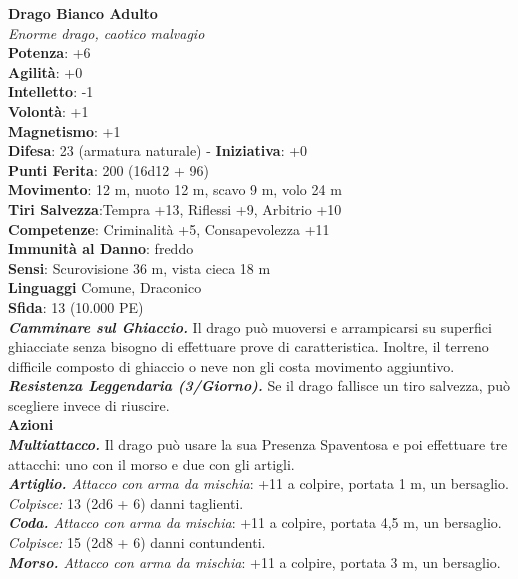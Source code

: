 \begin{multicols}{2}
\medskip\textbf{Drago Bianco Adulto}\\
\emph{Enorme drago, caotico malvagio}\\
\textbf{Potenza}: +6\\
\textbf{Agilità}: +0\\
\textbf{Intelletto}: -1\\
\textbf{Volontà}: +1\\
\textbf{Magnetismo}: +1\\
\textbf{Difesa}: 23 (armatura naturale) - \textbf{Iniziativa}: +0\\
\textbf{Punti Ferita}: 200 (16d12 + 96)\\
\textbf{Movimento}: 12 m, nuoto 12 m, scavo 9 m, volo 24 m\\
\textbf{Tiri Salvezza}:Tempra +13, Riflessi +9, Arbitrio +10\\
\textbf{Competenze}: Criminalità +5, Consapevolezza +11\\
\textbf{Immunità al Danno}: freddo\\
\textbf{Sensi}: Scurovisione 36 m, vista cieca 18 m\\
\textbf{Linguaggi} Comune, Draconico\\
\textbf{Sfida}: 13 (10.000 PE)\smallskip\\
\emph{\textbf{Camminare sul Ghiaccio.}} Il drago può muoversi e arrampicarsi su superfici ghiacciate senza bisogno di effettuare prove di caratteristica. Inoltre, il terreno difficile composto di ghiaccio o neve non gli costa movimento aggiuntivo.\\
\emph{\textbf{Resistenza Leggendaria (3/Giorno).}} Se il drago fallisce un tiro salvezza, può scegliere invece di riuscire.\\
\smallskip\textbf{Azioni}\\
\emph{\textbf{Multiattacco.}} Il drago può usare la sua Presenza Spaventosa e poi effettuare tre attacchi: uno con il morso e due con gli artigli.\\
\emph{\textbf{Artiglio.} Attacco con arma da mischia}: +11 a colpire, portata 1 m, un bersaglio.\\
\emph{Colpisce:} 13 (2d6 + 6) danni taglienti.\\
\emph{\textbf{Coda.} Attacco con arma da mischia}: +11 a colpire, portata 4,5 m, un bersaglio.\\
\emph{Colpisce:} 15 (2d8 + 6) danni contundenti.\\
\emph{\textbf{Morso.} Attacco con arma da mischia}: +11 a colpire, portata 3 m, un bersaglio.\\

\end{multicols}
